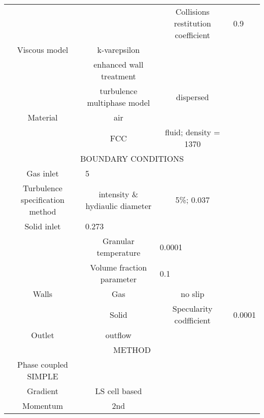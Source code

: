 \begin{table}[htbp]
\begin{tabular}{cccc}
          &       & \multicolumn{1}{p{11.25em}}{Collisions restitution coefficient} & \multicolumn{1}{l}{0.9} \\
    \multicolumn{1}{p{10em}}{Viscous model} & \multicolumn{1}{p{14.415em}}{k-varepsilon} &       &  \\
          & \multicolumn{1}{p{14.415em}}{enhanced wall treatment} &       &  \\
          & \multicolumn{1}{p{14.415em}}{turbulence multiphase model} & \multicolumn{1}{p{11.25em}}{dispersed} &  \\
    \multicolumn{1}{p{10em}}{Material} & \multicolumn{1}{p{14.415em}}{air} &       &  \\
          & \multicolumn{1}{p{14.415em}}{FCC} & \multicolumn{1}{p{11.25em}}{fluid; density = 1370} &  \\
      \midrule
    \multicolumn{4}{p{43.665em}}{BOUNDARY CONDITIONS} \\
      \midrule
    \multicolumn{1}{p{10em}}{Gas inlet} & \multicolumn{1}{l}{5} &       &  \\
    \multicolumn{1}{p{10em}}{Turbulence specification method} & \multicolumn{1}{p{14.415em}}{intensity \& hydiaulic diameter} & \multicolumn{1}{p{11.25em}}{5\%; 0.037} &  \\
    \multicolumn{1}{p{10em}}{Solid inlet} & \multicolumn{1}{l}{0.273} &        &  \\
          & \multicolumn{1}{p{14.415em}}{Granular temperature} & \multicolumn{1}{l}{0.0001} &  \\
          & \multicolumn{1}{p{14.415em}}{Volume fraction parameter} & \multicolumn{1}{l}{0.1} &  \\
    \multicolumn{1}{p{10em}}{Walls} & \multicolumn{1}{p{14.415em}}{Gas} & \multicolumn{1}{p{11.25em}}{no slip} &  \\
          & \multicolumn{1}{p{14.415em}}{Solid} & \multicolumn{1}{p{11.25em}}{Specularity codfficient} & \multicolumn{1}{l}{0.0001} \\
    \multicolumn{1}{p{10em}}{Outlet} & \multicolumn{1}{p{14.415em}}{outflow} &       &  \\
    \midrule
    \multicolumn{4}{p{43.665em}}{METHOD} \\
    \midrule
    \multicolumn{1}{p{10em}}{Phase coupled SIMPLE} &       &       &  \\
    \multicolumn{1}{p{10em}}{Gradient} & \multicolumn{1}{p{14.415em}}{LS cell based} &       &  \\
    \multicolumn{1}{p{10em}}{Momentum} & \multicolumn{1}{p{14.415em}}{2nd} &       &  \\

\end{tabular}
\end{table}
